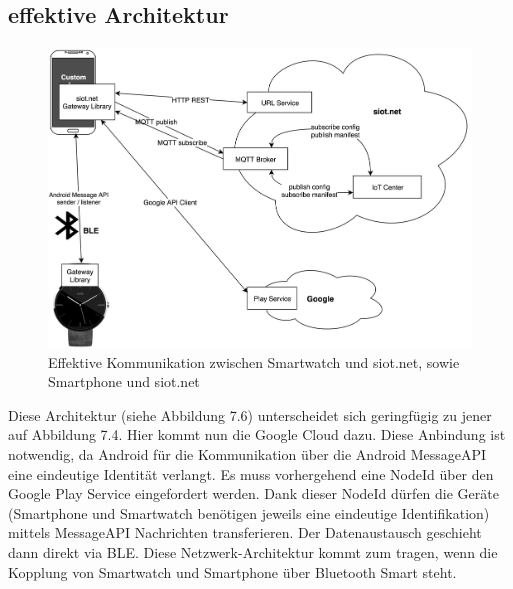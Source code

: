 \subsection{effektive Architektur}
\begin{figure}[h]
  \centering
  \includegraphics[scale=0.15]{98_Bilder/07_Architektur/03_Architektur}
  \caption[Effektive Netzwerk-Architektur mit BLE/ohne WLAN]{Effektive Kommunikation zwischen Smartwatch und siot.net, sowie Smartphone und siot.net}
\end{figure}
Diese Architektur (siehe Abbildung 7.6) unterscheidet sich geringfügig zu jener auf Abbildung 7.4. Hier kommt nun die Google Cloud dazu. Diese Anbindung ist notwendig, da Android für die Kommunikation über die Android Message\gls{API} eine eindeutige Identität verlangt. Es muss vorhergehend eine NodeId über den Google Play Service eingefordert werden. Dank dieser NodeId dürfen die Geräte (Smartphone und Smartwatch benötigen jeweils eine eindeutige Identifikation) mittels Message\gls{API} Nachrichten transferieren. Der Datenaustausch geschieht dann direkt via \gls{BLE}. Diese Netzwerk-Architektur kommt zum tragen, wenn die Kopplung von Smartwatch und Smartphone über Bluetooth Smart steht.

